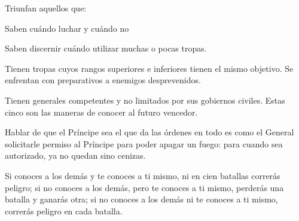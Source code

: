 Triunfan aquellos que:

Saben cuándo luchar y cuándo no

Saben discernir cuándo utilizar muchas o pocas tropas.

Tienen tropas cuyos rangos superiores e inferiores tienen el mismo objetivo. Se enfrentan con preparativos a enemigos desprevenidos.

Tienen generales competentes y no limitados por sus gobiernos civiles. Estas cinco son las maneras de conocer al futuro vencedor.

Hablar de que el Príncipe sea el que da las órdenes en todo es como el General solicitarle permiso al Príncipe para poder apagar un fuego: para cuando sea autorizado, ya no quedan sino cenizas.

Si conoces a los demás y te conoces a ti mismo, ni en cien batallas correrás peligro; si no conoces a los demás, pero te conoces a ti mismo, perderás una batalla y ganarás otra; si no conoces a los demás ni te conoces a ti mismo, correrás peligro en cada batalla.

